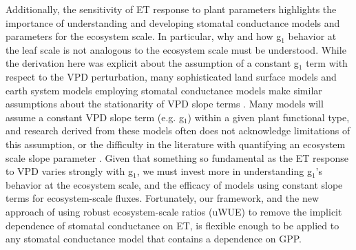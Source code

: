 \documentclass[draft]{agujournal2019}
\begin{document}
Additionally, the sensitivity of ET response to plant parameters
highlights the importance of understanding and developing stomatal
conductance models and parameters for the ecosystem scale. In
particular, why and how g$_1$ behavior at the leaf scale is not
analogous to the ecosystem scale must be understood. While the
derivation here was explicit about the assumption of a constant g$_1$
term with respect to the VPD perturbation, many sophisticated land
surface models and earth system models employing stomatal conductance
models make similar assumptions about the stationarity of VPD slope
terms \cite{Niu_2011, Franks_2017, Rogers_2017, Lawrence_2019}. Many
models will assume a constant VPD slope term (e.g. g$_1$) within
a given plant functional type, and research derived from these models
often does not acknowledge limitations of this assumption, or the
difficulty in the literature with quantifying an ecosystem scale slope
parameter \cite{Medlyn_2017}. Given that something so fundamental as
the ET response to VPD varies strongly with g$_1$, we must invest more
in understanding g$_1$'s behavior at the ecosystem scale, and the
efficacy of models using constant slope terms for ecosystem-scale
fluxes. Fortunately, our framework, and the new approach of using
robust ecosystem-scale ratios (uWUE) to remove the implicit dependence
of stomatal conductance on ET, is flexible enough to be applied to any
stomatal conductance model that contains a dependence on GPP.
\end{document}
